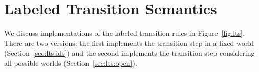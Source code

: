 \documentclass[sigplan,10pt,review]{acmart}\settopmatter{printfolios=true}
\begin{document}
\maketitle





\section{Labeled Transition Semantics}
\label{sec:lts}
We discuss implementations of the labeled transition rules in Figure~\ref{fig:lts}.
There are two versions:
the first implements the transition step in a fixed world (Section~\ref{sec:lts:ids})
and the second implements the transition step considering all possible worlds
(Section~\ref{sec:lts:open}).
%





\end{document}
